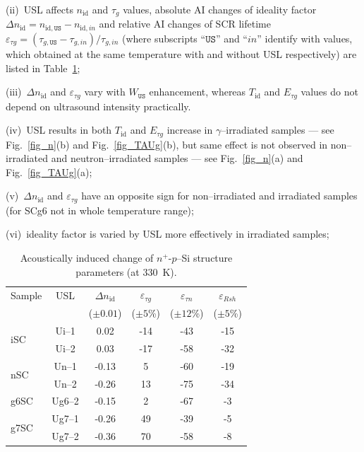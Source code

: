 \documentclass[aip,jap, amsmath,amssymb,reprint]{revtex4-1}
\begin{document}
\noindent
(ii)~USL affects $n_{\mathrm{id}}$ and $\tau_g$ values, absolute AI changes of ideality factor $\Delta n_{\mathrm{id}}=n_{\mathrm{id},\mathtt{US}}-n_{\mathrm{id},in}$ and
relative AI changes of SCR lifetime $\varepsilon_{\tau g}=(\tau_{g,\mathtt{US}}-\tau_{g,in})/\tau_{g,in}$
(where subscripts ``$\mathtt{US}$'' and ``$in$'' identify with values,
which obtained at the same temperature with and without USL respectively)
are listed in Table~\ref{tabAIchange};

\noindent
(iii)~$\Delta n_{\mathrm{id}}$ and $\varepsilon_{\tau g}$ vary with $W_{\mathtt{US}}$ enhancement, whereas $T_{\mathrm{id}}$ and $E_{\tau g}$ values do not depend on ultrasound intensity practically.


\noindent
(iv)~USL results in both $T_{\mathrm{id}}$ and $E_{\tau g}$ increase in $\gamma$--irradiated samples --- see Fig.~\ref{fig_n}(b) and Fig.~\ref{fig_TAUg}(b), but same effect is not observed in non--irradiated and neutron--irradiated samples --- see Fig.~\ref{fig_n}(a) and Fig.~\ref{fig_TAUg}(a);

\noindent
(v)~$\Delta n_{\mathrm{id}}$ and $\varepsilon_{\tau g}$ have an opposite sign for non--irradiated and irradiated samples
(for SCg6 not in whole temperature range);

\noindent
(vi)~ideality factor is varied by USL more effectively in irradiated samples;






\begin{table}
\caption{\label{tabAIchange}Acoustically induced change of $n^+$-$p$--Si structure parameters (at 330~K).
}
\begin{ruledtabular}
\begin{tabular}{lccccc}
Sample&USL&$\Delta n_{\mathrm{id}}$ &$\varepsilon_{\tau g}$ &$\varepsilon_{\tau n}$ &$\varepsilon_{Rsh}$ \\
&&\mbox{($\pm0.01$)}&($\pm5$\%)&($\pm12$\%)&($\pm5$\%)\\
\hline
\multirow{2}{*}{iSC}&Ui--1&0.02&-14&-43&-15\\
&Ui--2&0.03&-17&-58&-32\\
\multirow{2}{*}{nSC}&Un--1&-0.13&5&-60&-19\\
&Un--2&-0.26&13&-75&-34\\
g6SC&Ug6--2&-0.15&2&-67&-3\\
\multirow{2}{*}{g7SC}&Ug7--1&-0.26&49&-39&-5\\
&Ug7--2&-0.36&70&-58&-8\\
\end{tabular}
\end{ruledtabular}
\end{table}
\end{document}
